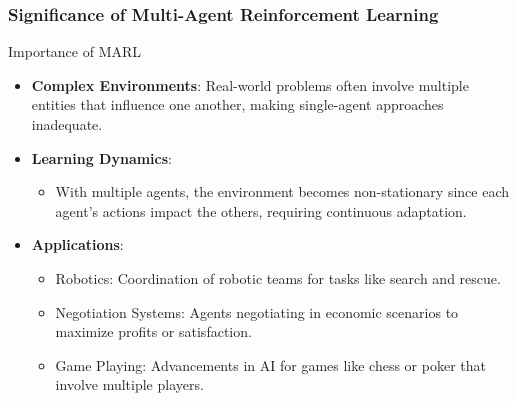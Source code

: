 \documentclass[aspectratio=169]{beamer}
\begin{document}
\begin{frame}[fragile]
    \frametitle{Significance of Multi-Agent Reinforcement Learning}
    \begin{block}{Importance of MARL}
        \begin{itemize}
            \item \textbf{Complex Environments}: Real-world problems often involve multiple entities that influence one another, making single-agent approaches inadequate.
            \item \textbf{Learning Dynamics}: 
            \begin{itemize}
                \item With multiple agents, the environment becomes non-stationary since each agent’s actions impact the others, requiring continuous adaptation.
            \end{itemize}
            \item \textbf{Applications}:
            \begin{itemize}
                \item Robotics: Coordination of robotic teams for tasks like search and rescue.
                \item Negotiation Systems: Agents negotiating in economic scenarios to maximize profits or satisfaction.
                \item Game Playing: Advancements in AI for games like chess or poker that involve multiple players.
            \end{itemize}
        \end{itemize}
    \end{block}
\end{frame}
\end{document}
